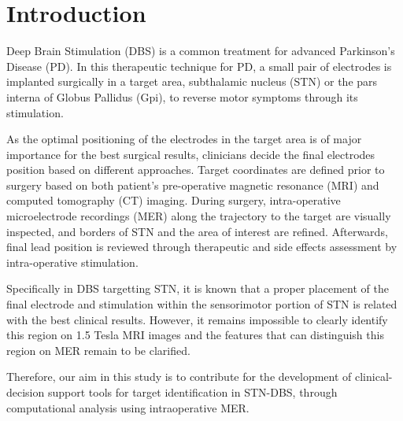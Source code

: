 \chapter{Introduction}


Deep Brain Stimulation (DBS) is a common treatment for advanced Parkinson's Disease (PD). In this therapeutic technique for PD, a small pair of electrodes is implanted surgically in a target area, subthalamic nucleus (STN) or the pars interna of Globus Pallidus (Gpi), to reverse motor symptoms through its stimulation. 

As the optimal positioning of the electrodes in the target area is of major importance for the best surgical results, clinicians decide the final electrodes position based on different approaches. Target coordinates are defined prior to surgery based on both patient's pre-operative magnetic resonance (MRI) and computed tomography (CT) imaging. During surgery, intra-operative microelectrode recordings (MER) along the trajectory to the target are visually inspected, and borders of STN and the area of interest are refined. Afterwards, final lead position is reviewed through therapeutic and side effects assessment by intra-operative stimulation. 

Specifically in DBS targetting STN, it is known that a proper placement of the final electrode and stimulation within the sensorimotor portion of STN is related with the best clinical results. However, it remains impossible to clearly identify this region on 1.5 Tesla MRI images and the features that can distinguish this region on MER remain to be clarified. 

Therefore, our aim in this study is to contribute for the development of clinical-decision support tools for target identification in STN-DBS, through computational analysis using intraoperative MER. 


